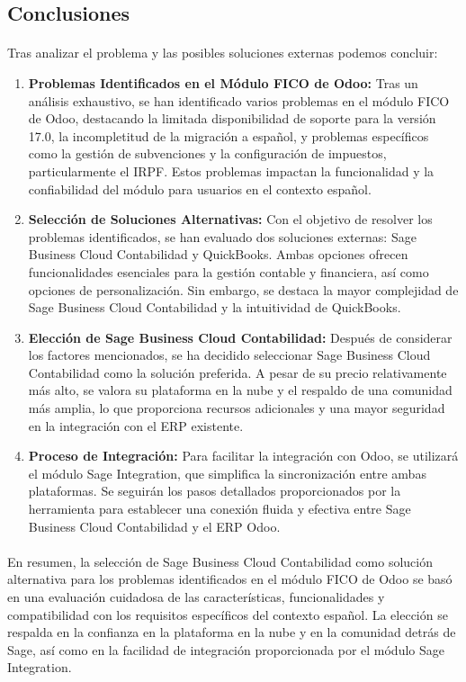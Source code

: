 \subsection{Conclusiones}
\paragraph{}
Tras analizar el problema y las posibles soluciones externas podemos concluir:

\begin{enumerate}
    \item \textbf{Problemas Identificados en el Módulo FICO de Odoo:} Tras un análisis exhaustivo, se han identificado varios problemas en el módulo FICO de Odoo, destacando la limitada disponibilidad de soporte para la versión 17.0, la incompletitud de la migración a español, y problemas específicos como la gestión de subvenciones y la configuración de impuestos, particularmente el IRPF. Estos problemas impactan la funcionalidad y la confiabilidad del módulo para usuarios en el contexto español.
    
    \item \textbf{Selección de Soluciones Alternativas:} Con el objetivo de resolver los problemas identificados, se han evaluado dos soluciones externas: Sage Business Cloud Contabilidad y QuickBooks. Ambas opciones ofrecen funcionalidades esenciales para la gestión contable y financiera, así como opciones de personalización. Sin embargo, se destaca la mayor complejidad de Sage Business Cloud Contabilidad y la intuitividad de QuickBooks.
    
    \item \textbf{Elección de Sage Business Cloud Contabilidad:} Después de considerar los factores mencionados, se ha decidido seleccionar Sage Business Cloud Contabilidad como la solución preferida. A pesar de su precio relativamente más alto, se valora su plataforma en la nube y el respaldo de una comunidad más amplia, lo que proporciona recursos adicionales y una mayor seguridad en la integración con el ERP existente.
    
    \item \textbf{Proceso de Integración:} Para facilitar la integración con Odoo, se utilizará el módulo Sage Integration, que simplifica la sincronización entre ambas plataformas. Se seguirán los pasos detallados proporcionados por la herramienta para establecer una conexión fluida y efectiva entre Sage Business Cloud Contabilidad y el ERP Odoo.
\end{enumerate}
\paragraph{}
En resumen, la selección de Sage Business Cloud Contabilidad como solución alternativa para los problemas identificados en el módulo FICO de Odoo se basó en una evaluación cuidadosa de las características, funcionalidades y compatibilidad con los requisitos específicos del contexto español. La elección se respalda en la confianza en la plataforma en la nube y en la comunidad detrás de Sage, así como en la facilidad de integración proporcionada por el módulo Sage Integration.
